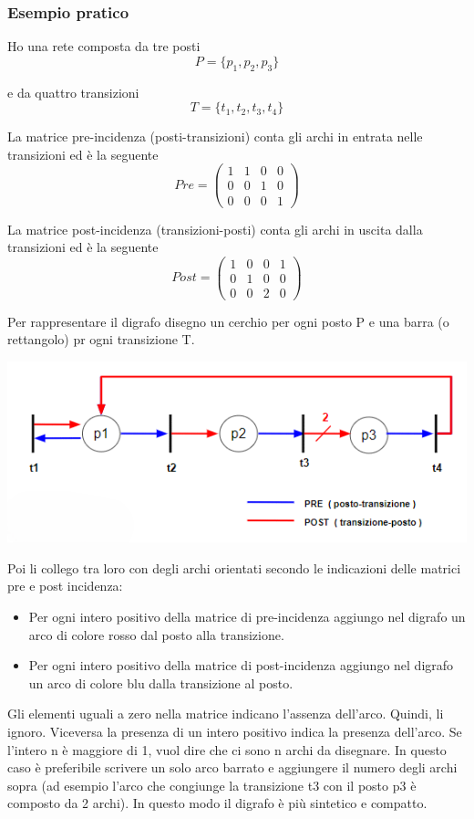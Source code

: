 \documentclass{article}
\begin{document}
\subsubsection{Esempio pratico}

Ho una rete composta da tre posti
\[
P = \{ p_1, p_2, p_3 \}
\]

e da quattro transizioni
\[
T = \{ t_1, t_2, t_3, t_4 \}
\]

La matrice pre-incidenza (posti-transizioni) conta gli archi in entrata nelle transizioni ed è la seguente
\[
Pre = \begin{pmatrix} 1 & 1 & 0 & 0 \\ 0 & 0 & 1 & 0 \\ 0 & 0 & 0 & 1 \end{pmatrix}
\]

La matrice post-incidenza (transizioni-posti) conta gli archi in uscita dalla transizioni ed è la seguente
\[
Post = \begin{pmatrix} 1 & 0 & 0 & 1 \\ 0 & 1 & 0 & 0 \\ 0 & 0 & 2 & 0 \end{pmatrix}
\]

Per rappresentare il digrafo disegno un cerchio per ogni posto P e una barra (o rettangolo) pr ogni transizione T.\\
\begin{center}
    \includegraphics{imgGrafi/esempio-rete-di-petri.png}
\end{center}
Poi li collego tra loro con degli archi orientati secondo le indicazioni delle matrici pre e post incidenza:
\begin{itemize}
    \item Per ogni intero positivo della matrice di pre-incidenza aggiungo nel digrafo un arco di colore rosso dal posto alla transizione.
    \item Per ogni intero positivo della matrice di post-incidenza aggiungo nel digrafo un arco di colore blu dalla transizione al posto.
\end{itemize}
Gli elementi uguali a zero nella matrice indicano l'assenza dell'arco. Quindi, li ignoro. Viceversa la presenza di un intero positivo indica la presenza dell'arco. Se l'intero n è maggiore di 1, vuol dire che ci sono n archi da disegnare. In questo caso è preferibile scrivere un solo arco barrato e aggiungere il numero degli archi sopra (ad esempio l'arco che congiunge la transizione t3 con il posto p3 è composto da 2 archi). In questo modo il digrafo è più sintetico e compatto.
\end{document}
